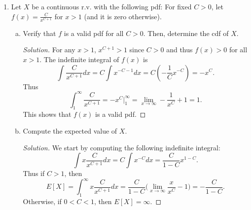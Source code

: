 \documentclass[12pt]{article}
\newenvironment{solution}
{\renewcommand\qedsymbol{$\blacksquare$}\begin{proof}[Solution]}
{\end{proof}}
\begin{document}
\begin{enumerate}
\begin{enumerate}[(a)]
\begin{solution}
                    \end{solution}
            \end{enumerate}
        \item Let $X$ be a continuous r.v. with the following pdf: For fixed
            $C>0$, let $f(x)=\frac{C}{x^{C+1}}$ for $x>1$ (and it is zero
            otherwise).
            \begin{enumerate}[(a)]
                \item Verify that $f$ is a valid pdf for all $C>0$. Then,
                    determine the cdf of $X$.
                    \begin{solution}
                        For any $x>1$, $x^{C+1}>1$ since $C>0$ and thus
                        $f(x)>0$ for all $x>1$. The indefinite integral of
                        $f(x)$ is 
                        \begin{equation*}
                            \int \frac{C}{x^{C+1}}dx=C\int
                            x^{-C-1}dx=C(-\frac{1}{C}x^{-C})=-x^C.
                        \end{equation*}
                        Thus 
                        \begin{equation*}
                            \int_{1}^{\infty}\frac{C}{x^{C+1}}
                            =-x^C\bigg|_{1}^{\infty}=\lim_{x\to\infty}-\frac{1}{x^C}+1=1.
                        \end{equation*}
                        This shows that $f(x)$ is a valid pdf. 
                    \end{solution}
                \item Compute the expected value of $X$. 
                    \begin{solution}
                        We start by computing the following indefinite
                        integral:
                        \begin{equation*}
                            \int x\frac{C}{x^{C+1}}dx=C\int
                            x^{-C}dx=\frac{C}{1-C}x^{1-C}.
                        \end{equation*}
                        Thus if $C>1$, then 
                        \begin{equation*}
                            E[X]=\int_{1}^{\infty}x\frac{C}{x^{C+1}}dx
                            =\frac{C}{1-C}\bigg(
                            \lim_{x\to\infty}\frac{x}{x^C}-1\bigg)=-\frac{C}{1-C}.
                        \end{equation*}
                        Otherwise, if $0<C<1$, then $E[X]=\infty$. 

\end{solution}
\end{enumerate}
\end{enumerate}
\end{document}
